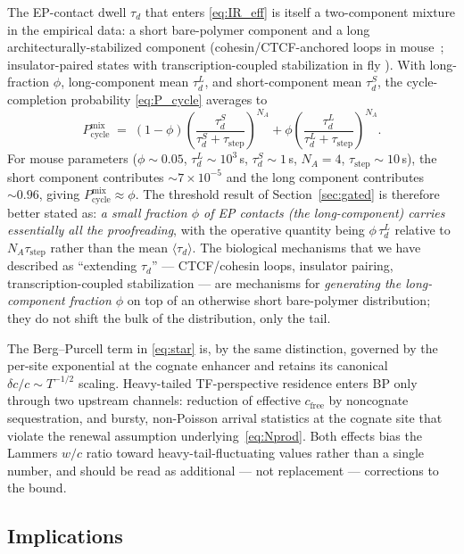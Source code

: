 \documentclass[11pt]{article}
\begin{document}
The EP-contact dwell $\tau_d$ that enters \eqref{eq:IR_eff} is itself a
two-component mixture in the empirical data: a short bare-polymer
component and a long architecturally-stabilized component
(cohesin/CTCF-anchored loops in mouse~\cite{Gabriele2022,Mach2022};
insulator-paired states with transcription-coupled stabilization in fly
\cite{Chen2018}). With long-fraction $\phi$, long-component mean
$\tau_d^{L}$, and short-component mean $\tau_d^{S}$, the cycle-completion
probability \eqref{eq:P_cycle} averages to
\begin{equation}
  P_{\mathrm{cycle}}^{\mathrm{mix}}
  \;=\; (1-\phi)\!\left(\frac{\tau_d^{S}}{\tau_d^{S}+\tau_{\mathrm{step}}}\right)^{\!N_A}
  + \phi\!\left(\frac{\tau_d^{L}}{\tau_d^{L}+\tau_{\mathrm{step}}}\right)^{\!N_A}.
  \label{eq:P_cycle_mix}
\end{equation}
For mouse parameters ($\phi\sim 0.05$, $\tau_d^{L}\sim 10^{3}$\,s,
$\tau_d^{S}\sim 1$\,s, $N_A = 4$, $\tau_{\mathrm{step}}\sim 10$\,s), the
short component contributes $\sim 7\times 10^{-5}$ and the long
component contributes $\sim 0.96$, giving
$P_{\mathrm{cycle}}^{\mathrm{mix}}\approx\phi$. The threshold result of
Section~\ref{sec:gated} is therefore better stated as: \emph{a small
fraction $\phi$ of EP contacts (the long-component) carries essentially
all the proofreading}, with the operative quantity being
$\phi\,\tau_d^{L}$ relative to $N_A\tau_{\mathrm{step}}$ rather than the
mean $\langle\tau_d\rangle$. The biological mechanisms that we have
described as ``extending $\tau_d$'' --- CTCF/cohesin loops, insulator
pairing, transcription-coupled stabilization --- are mechanisms for
\emph{generating the long-component fraction $\phi$} on top of an
otherwise short bare-polymer distribution; they do not shift the bulk
of the distribution, only the tail.

The Berg--Purcell term in \eqref{eq:star} is, by the same distinction,
governed by the per-site exponential at the cognate enhancer and
retains its canonical $\delta c/c \sim T^{-1/2}$ scaling. Heavy-tailed
TF-perspective residence enters BP only through two upstream channels:
reduction of effective $c_{\mathrm{free}}$ by noncognate sequestration,
and bursty, non-Poisson arrival statistics at the cognate site that
violate the renewal assumption underlying~\eqref{eq:Nprod}. Both effects
bias the Lammers $w/c$ ratio toward heavy-tail-fluctuating values rather
than a single number, and should be read as additional --- not
replacement --- corrections to the bound.

\subsection{Implications}
\end{document}
